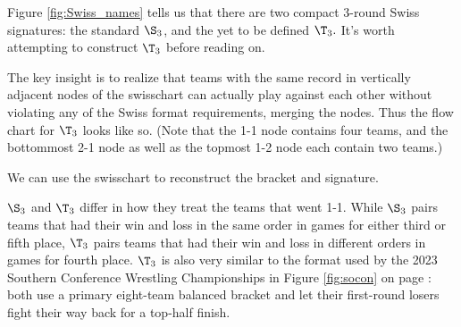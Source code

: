 {    

    Figure \ref{fig:Swiss_names} tells us that there are two compact 3-round Swiss signatures: the standard $\S_3$, and the yet to be defined $\T_3.$ It's worth attempting to construct $\T_3$ before reading on.

    \pagebreak

    The key insight is to realize that teams with the same record in vertically adjacent nodes of the swisschart can actually play against each other without violating any of the Swiss format requirements, merging the nodes. Thus the flow chart for $\T_3$ looks like so. (Note that the 1-1 node contains four teams, and the bottommost 2-1 node as well as the topmost 1-2 node each contain two teams.)


    We can use the swisschart to reconstruct the bracket and signature.


    $\S_3$ and $\T_3$ differ in how they treat the teams that went 1-1. While $\S_3$ pairs teams that had their win and loss in the same order in games for either third or fifth place, $\T_3$ pairs teams that had their win and loss in different orders in games for fourth place.
    $\T_3$ is also very similar to the format used by the 2023 Southern Conference Wrestling Championships in Figure \ref{fig:socon} on page \pageref{fig:socon}: both use a primary eight-team balanced bracket and let their first-round losers fight their way back for a top-half finish.

}
